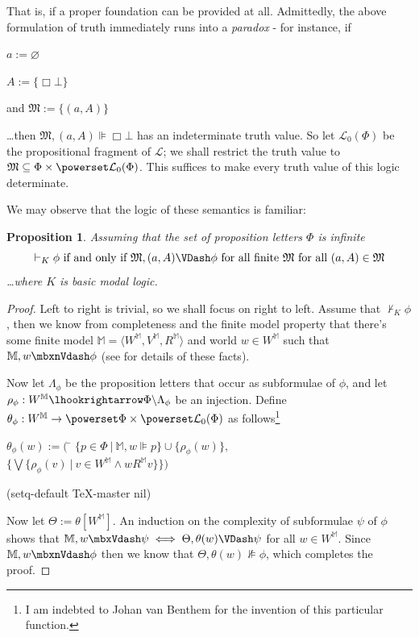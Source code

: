 \documentclass[11pt]{article}
\numberwithin{equation}{subsection}
\newtheorem{prop}[theorem]{Proposition}
\renewcommand{\Vdash}{\mbxVdash}
\renewcommand{\nVdash}{\mbxnVdash}
\newcommand{\bs}{\ensuremath{\backslash}}
\renewcommand{\Omega}{\mathfrak{M}}
\begin{document}
That is, if a proper foundation can be provided at all.  Admittedly,
the above formulation of truth immediately runs into a \emph{paradox}
- for instance, if 
\begin{bul}
\item $a:=\varnothing$ 
\item $A:=\{\Box \bot\}$
\item and $\Omega:= \{(a,A)\}$
\end{bul}
\ldots then $\Omega,(a,A)\VDash \Box \bot$ has an indeterminate truth
value.  So let $\mathcal{L}_0(\Phi)$ be the propositional fragment of
$\mathcal{L}$; we shall restrict the truth value to $\Omega\subseteq
\Phi \times \powerset \mathcal{L}_0(\Phi)$.  This suffices to make
every truth value of this logic determinate.

We may observe that the logic of these semantics is familiar:
\begin{prop}
Assuming that the set of proposition letters $\Phi$ is infinite
$$\vdash_{K} \phi\textup{ if and only if } \Omega, (a,A) \VDash \phi \textup{ for all finite $\Omega$ for all $(a,A) \in \Omega$}$$
\ldots where $K$ is basic modal logic.
\end{prop}
\begin{proof}
 Left to right is trivial, so we shall focus on right to left.  Assume that $\nvdash_{K} \phi$, then we know from completeness and the finite model property that there's some finite model $\mathbb{M}=\langle W^\mathbb{M}, V^\mathbb{M}, R^\mathbb{M}\rangle$ and world $w \in W^\mathbb{M}$ such that $\mathbb{M},w \nVdash \phi$ (see \citet[chapters 2 \& 4]{blackburn_modal_2001} for details of these facts).

Now let $\Lambda_\phi$ be the proposition letters that occur as subformulae of $\phi$, and let $\rho_\phi : W^\mathbb{M} \lhookrightarrow \Phi \bs \Lambda_\phi$ be an injection.  Define $\theta_\phi:W^\mathbb{M}\to \powerset\Phi \times \powerset \mathcal{L}_0(\Phi)$ as follows\footnote{I am indebted to Johan van Benthem for the invention of this particular function.}
\begin{center}
\begin{minipage}{3in}
\begin{tabbing}
	$\theta_\phi(w) := ($ \= $\{p\in \Phi \ |\ \mathbb{M},w\VDash p\} \cup \{\rho_\phi(w)\},$\\
                       \> $\{ \bigvee \{\rho_\phi(v) \ | \ v\in W^\mathbb{M} \wedge w R^\mathbb{M}v \} \})$
\end{tabbing}
\end{minipage}
\end{center}
	

(setq-default TeX-master nil)


Now let $\Theta := \theta[W^\mathbb{M}]$. An induction on the complexity of subformulae $\psi$ of $\phi$ shows that 
$\mathbb{M},w\Vdash \psi \iff \Theta,\theta(w) \VDash \psi$ for all $w \in W^\mathbb{M}$.  Since 
$\mathbb{M}, w \nVdash \phi$ then we know that $\Theta,\theta(w)\nVDash \phi$, which completes the proof.
\end{proof}
\end{document}
